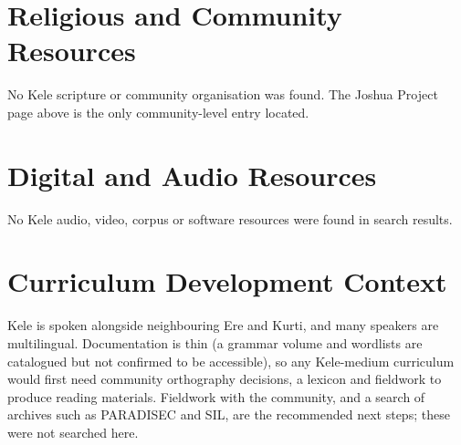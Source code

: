\documentclass[12pt]{article}
\begin{document}
\section{Religious and Community Resources}
No Kele scripture or community organisation was found. The Joshua Project page above is the only community-level entry located.

\section{Digital and Audio Resources}
No Kele audio, video, corpus or software resources were found in search results.

\section{Curriculum Development Context}
Kele is spoken alongside neighbouring Ere and Kurti, and many speakers are multilingual. Documentation is thin (a grammar volume and wordlists are catalogued but not confirmed to be accessible), so any Kele-medium curriculum would first need community orthography decisions, a lexicon and fieldwork to produce reading materials. Fieldwork with the community, and a search of archives such as PARADISEC and SIL, are the recommended next steps; these were not searched here.
\end{document}
